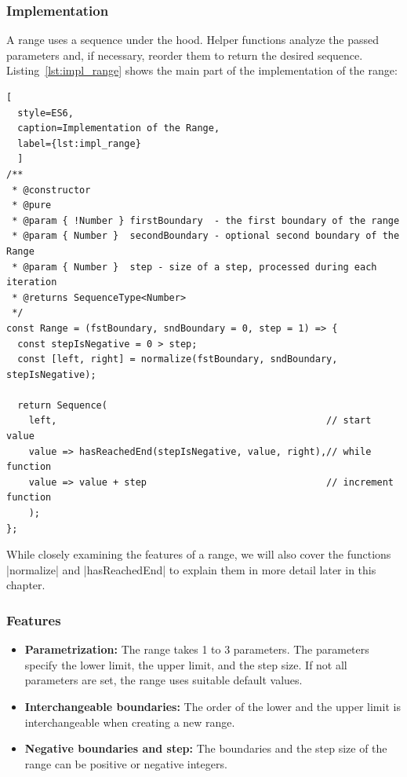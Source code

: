 \subsubsection{Implementation}
\label{subsub:Implementation}
A range uses a sequence under the hood. Helper functions analyze the passed
parameters and, if necessary, reorder them to return the desired sequence.
Listing~\ref{lst:impl_range} shows the main part of the implementation of the
range:

\begin{lstlisting}[
  style=ES6, 
  caption=Implementation of the Range,
  label={lst:impl_range}
  ]
/**
 * @constructor
 * @pure
 * @param { !Number } firstBoundary  - the first boundary of the range
 * @param { Number }  secondBoundary - optional second boundary of the Range
 * @param { Number }  step - size of a step, processed during each iteration
 * @returns SequenceType<Number>
 */
const Range = (fstBoundary, sndBoundary = 0, step = 1) => {
  const stepIsNegative = 0 > step;
  const [left, right] = normalize(fstBoundary, sndBoundary, stepIsNegative);

  return Sequence(
    left,                                                // start value
    value => hasReachedEnd(stepIsNegative, value, right),// while function
    value => value + step                                // increment function
    );
};
\end{lstlisting}

While closely examining the features of a range, we will also cover the functions
|normalize| and |hasReachedEnd| to explain them in more detail later in this
chapter.

\subsubsection{Features}
\label{subsub:Features}

\begin{itemize}
  \item \textbf{Parametrization:} The range takes 1 to 3 parameters. The
    parameters specify the lower limit, the upper limit, and the step size. If
  not all parameters are set, the range uses suitable default values.
\item \textbf{Interchangeable boundaries:} The order of the lower and the upper
  limit is interchangeable when creating a new range.
\item \textbf{Negative boundaries and step:} The boundaries and the step size
  of the range can be positive or negative integers.
\end{itemize}

